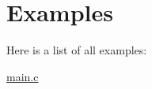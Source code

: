 \section{Examples}
Here is a list of all examples\+:\begin{DoxyCompactItemize}
\item 
\hyperlink{main_8c-example}{main.\+c}
\end{DoxyCompactItemize}
